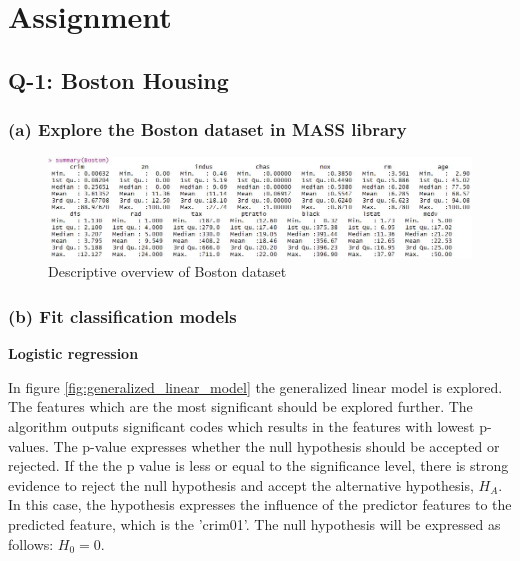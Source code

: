 \section{Assignment}

\subsection{Q-1: Boston Housing}

\subsubsection*{(a) Explore the Boston dataset in MASS library}
\begin{figure}[H]
\centering
\includegraphics[scale=0.49]{Graphics/Assignment1/ExploreBoston.JPG}
\caption{Descriptive overview of Boston dataset}
\label{fig:logistic_regression_confusions_matrix_001}
\end{figure}


\subsubsection*{(b) Fit classification models}
\textbf{Logistic regression}

In figure \ref{fig:generalized_linear_model} the generalized linear model is explored. The features which are the most significant should be explored further. The algorithm outputs significant codes which results in the features with lowest p-values. The p-value expresses whether the null hypothesis should be accepted or rejected. If the the p value is less or equal to the significance level, there is strong evidence to reject the null hypothesis and accept the alternative hypothesis, $H_A$.   
In this case, the hypothesis expresses the influence of the predictor features to the predicted feature, which is the 'crim01'. The null hypothesis will be expressed as follows: $H_0 = 0$. 

